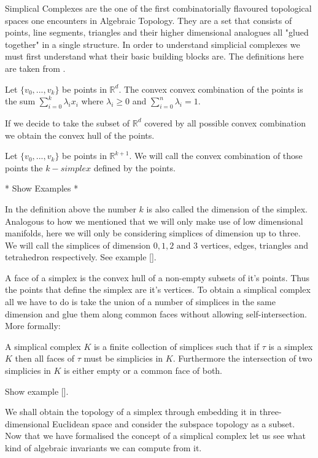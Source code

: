 Simplical Complexes are the one of the first combinatorially flavoured topological spaces one encounters in Algebraic Topology. They are a set that consists of points, line segments, triangles and their higher dimensional analogues all "glued together" in a single structure. In order to understand simplicial complexes we must first understand what their basic building blocks are. The definitions here are taken from \cite{comp-topo}.

\begin{defn} Let $\{v_0, ..., v_k\}$ be points in $\mathbb{R}^d$. The convex convex combination of the points is the sum $\sum_{i=0}^k{\lambda_ix_i}$ where $\lambda_i \ge 0$ and $\sum_{i=0}^n{\lambda_i} = 1$.  \end{defn}

If we decide to take the subset of $\mathbb{R}^d$ covered by all possible convex combination we obtain the convex hull of the points. 

\begin{defn} Let $\{v_0, ..., v_k\}$ be points in $\mathbb{R}^{k+1}$. We will call the convex combination of those points the $k-simplex$ defined by the points.  \end{defn}

* Show Examples *

In the definition above the number $k$ is also called the dimension of the simplex. Analogous to how we mentioned that we will only make use of low dimensional manifolds, here we will only be considering simplices of dimension up to three. We will call the simplices of dimension $0, 1, 2 \text{ and } 3$ vertices, edges, triangles and tetrahedron respectively. See example []. 

A face of a simplex is the convex hull of a non-empty subsets of it's points. Thus the points that define the simplex are it's vertices. To obtain a simplical complex all we have to do is take the union of a number of simplices in the same dimension and glue them along common faces without allowing self-intersection. More formally:

\begin{defn} A simplical complex $K$ is a finite collection of simplices such that if $\tau$ is a simplex $K$ then all faces of $\tau$ must be simplicies in $K$. Furthermore the intersection of two simplicies in $K$ is either empty or a common face of both.  \end{defn}

Show example [].

We shall obtain the topology of a simplex through embedding it in three-dimensional Euclidean space and consider the subspace topology as a subset. Now that we have formalised the concept of a simplical complex let us see what kind of algebraic invariants we can compute from it.

